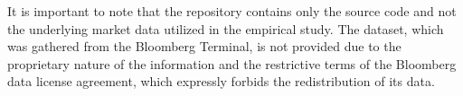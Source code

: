 It is important to note that the repository contains only the source code and not the underlying market data utilized in the empirical study. The dataset, which was gathered from the Bloomberg Terminal, is not provided due to the proprietary nature of the information and the restrictive terms of the Bloomberg data license agreement, which expressly forbids the redistribution of its data.